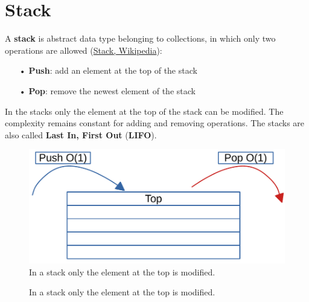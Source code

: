 \section{Stack}
\label{stack}
A \textbf{stack} is abstract data type belonging to collections, in which only two operations are allowed \cite{wikistack} (\href{https://en.wikipedia.org/wiki/Stack_(abstract_data_type)}{Stack, Wikipedia}):
\begin{itemize}
\item[•] \textbf{Push}: add an element at the top of the stack
\item[•] \textbf{Pop}: remove the newest element of the stack
\end{itemize}
In the stacks only the element at the top of the stack can be modified. The complexity remains constant for adding and removing operations. The stacks are also called \textbf{Last In, First Out} (\textbf{LIFO}).
\begin{figure}[H]
	\begin{center}
		\includegraphics[scale=.6]{chapters/datastructures/images/stack_1.pdf}
		\caption[In a stack only the element at the top is modified.]{In a stack only the element at the top is modified.}
		\label{stack_1}
	\end{center}
\end{figure}

\begin{figure}[H]
\centering
{}
\caption[In a stack only the element at the top is modified.]{In a stack only the element at the top is modified.}
\label{stack_1}
\end{figure}

